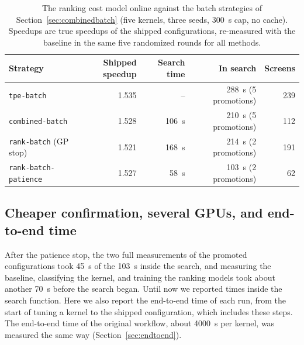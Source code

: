 \documentclass[10pt]{article}
\newcommand{\code}[1]{\texttt{#1}}
\begin{document}
\begin{table}[t]
\centering
\caption{The ranking cost model online against the batch strategies of
Section~\ref{sec:combinedbatch} (five kernels, three seeds, 300~s cap, no
cache). Speedups are true speedups of the shipped configurations, re-measured
with the baseline in the same five randomized rounds for all methods.}
\label{tab:rankonline}
\small
\begin{tabular}{lrrrr}
\toprule
Strategy & Shipped speedup & Search time & In search & Screens \\
\midrule
\code{tpe-batch} & 1.535 & -- & 288~s (5 promotions) & 239 \\
\code{combined-batch} & 1.528 & 106~s & 210~s (5 promotions) & 112 \\
\code{rank-batch} (GP stop) & 1.521 & 168~s & 214~s (2 promotions) & 191 \\
\code{rank-batch-patience} & 1.527 & 58~s & 103~s (2 promotions) & 62 \\
\bottomrule
\end{tabular}
\end{table}

\subsection{Cheaper confirmation, several GPUs, and end-to-end time}
\label{sec:confirm}
After the patience stop, the two full measurements of the promoted
configurations took 45~s of the 103~s inside the search, and measuring the
baseline, classifying the kernel, and training the ranking models took about
another 70~s before the search began. Until now we reported times inside the
search function. Here we also report the end-to-end time of each run, from
the start of tuning a kernel to the shipped configuration, which includes
these steps. The end-to-end time of the original workflow, about 4000~s per
kernel, was measured the same way (Section~\ref{sec:endtoend}).
\end{document}
